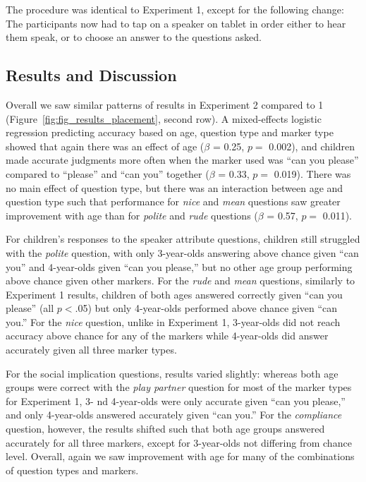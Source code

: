 \documentclass[10pt, letterpaper]{article}
\begin{document}
The procedure was identical to Experiment 1, except for the following
change: The participants now had to tap on a speaker on tablet in order
either to hear them speak, or to choose an answer to the questions
asked.

\subsection{Results and Discussion}\label{results-and-discussion-1}

Overall we saw similar patterns of results in Experiment 2 compared to 1
(Figure~\ref{fig:fig_results_placement}, second row). A mixed-effects
logistic regression predicting accuracy based on age, question type and
marker type showed that again there was an effect of age (\(\beta\) =
0.25, \(p =\) 0.002), and children made accurate judgments more often
when the marker used was ``can you please'' compared to ``please'' and
``can you'' together (\(\beta\) = 0.33, \(p =\) 0.019). There was no
main effect of question type, but there was an interaction between age
and question type such that performance for \emph{nice} and \emph{mean}
questions saw greater improvement with age than for \emph{polite} and
\emph{rude} questions (\(\beta\) = 0.57, \(p =\) 0.011).

For children's responses to the speaker attribute questions, children
still struggled with the \emph{polite} question, with only 3-year-olds
answering above chance given ``can you'' and 4-year-olds given ``can you
please,'' but no other age group performing above chance given other
markers. For the \emph{rude} and \emph{mean} questions, similarly to
Experiment 1 results, children of both ages answered correctly given
``can you please'' (all \(p<\).05) but only 4-year-olds performed above
chance given ``can you.'' For the \emph{nice} question, unlike in
Experiment 1, 3-year-olds did not reach accuracy above chance for any of
the markers while 4-year-olds did answer accurately given all three
marker types.

For the social implication questions, results varied slightly: whereas
both age groups were correct with the \emph{play partner} question for
most of the marker types for Experiment 1, 3- nd 4-year-olds were only
accurate given ``can you please,'' and only 4-year-olds answered
accurately given ``can you.'' For the \emph{compliance} question,
however, the results shifted such that both age groups answered
accurately for all three markers, except for 3-year-olds not differing
from chance level. Overall, again we saw improvement with age for many
of the combinations of question types and markers.
\end{document}
